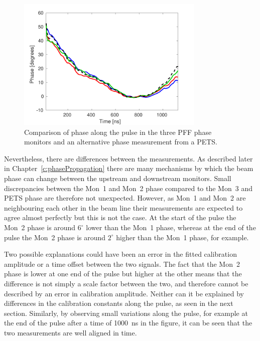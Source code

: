 \begin{figure}
  \centering
  \includegraphics[width=0.8\textwidth]{Figures/phaseMons/phaseAlongAll}
  \caption{Comparison of phase along the pulse in the three PFF phase monitors and an alternative phase measurement from a PETS.}
  \label{f:phaseAlongAll}
\end{figure}

Nevertheless, there are differences between the measurements. As described later in Chapter~\ref{c:phasePropagation} there are many mechanisms by which the beam phase can change between the upstream and downstream monitors. Small discrepancies between the Mon~1 and Mon~2 phase compared to the Mon~3 and PETS phase are therefore not unexpected.  However, as Mon~1 and Mon~2 are neighbouring each other in the beam line their measurements are expected to agree almost perfectly but this is not the case. At the start of the pulse the Mon~2 phase is around \(6^\circ\) lower than the Mon~1 phase, whereas at the end of the pulse the Mon~2 phase is around \(2^\circ\) higher than the Mon~1 phase, for example. 

Two possible explanations could have been an error in the fitted calibration amplitude or a time offset between the two signals. The fact that the Mon~2 phase is lower at one end of the pulse but higher at the other means that the difference is not simply a scale factor between the two, and therefore cannot be described by an error in calibration amplitude. Neither can it be explained by differences in the calibration constants along the pulse, as seen in the next section. Similarly, by observing small variations along the pulse, for example at the end of the pulse after a time of 1000~ns in the figure, it can be seen that the two measurements are well aligned in time.

